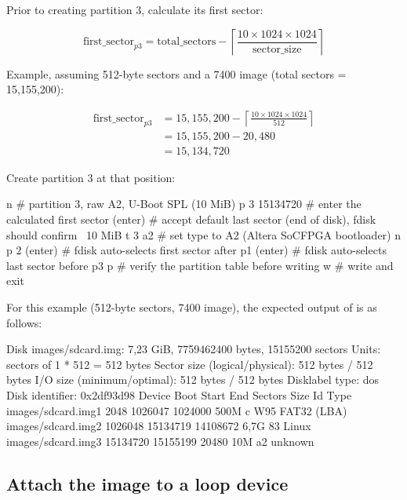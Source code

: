 Prior to creating partition 3, calculate its first sector:

\[
\text{first\_sector}_{p3} = \text{total\_sectors} - \left\lceil \frac{10 \times 1024 \times 1024}{\text{sector\_size}} \right\rceil
\]

Example, assuming 512-byte sectors and a 7400  image (total sectors = 15{,}155{,}200):

\[
\begin{aligned}
\text{first\_sector}_{p3} &= 15{,}155{,}200 - \left\lceil \frac{10 \times 1024 \times 1024}{512} \right\rceil \\
&= 15{,}155{,}200 - 20{,}480 \\
&= 15{,}134{,}720
\end{aligned}
\]

Create partition 3 at that position:

\begin{shellcodehost}
n               # partition 3, raw A2, U-Boot SPL (10 MiB)
p
3
15134720        # enter the calculated first sector
(enter)         # accept default last sector (end of disk), fdisk should confirm ~10 MiB
t
3
a2              # set type to A2 (Altera SoCFPGA bootloader)
n
p
2
(enter)         # fdisk auto-selects first sector after p1
(enter)         # fdisk auto-selects last sector before p3
p               # verify the partition table before writing
w               # write and exit
\end{shellcodehost}

For this example (512-byte sectors, 7400  image), the expected output of  is as follows:

\begin{shellcodehost}
Disk images/sdcard.img: 7,23 GiB, 7759462400 bytes, 15155200 sectors
Units: sectors of 1 * 512 = 512 bytes
Sector size (logical/physical): 512 bytes / 512 bytes
I/O size (minimum/optimal): 512 bytes / 512 bytes
Disklabel type: dos
Disk identifier: 0x2df93d98
Device             Boot  Start      End        Sectors   Size  Id  Type
images/sdcard.img1       2048       1026047    1024000   500M  c   W95 FAT32 (LBA)
images/sdcard.img2       1026048    15134719   14108672  6,7G  83  Linux
images/sdcard.img3       15134720   15155199   20480     10M   a2  unknown
\end{shellcodehost}

\subsection{Attach the image to a loop device}

